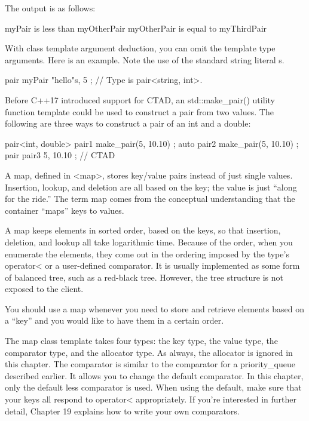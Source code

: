 The output is as follows:

\begin{shell}
myPair is less than myOtherPair
myOtherPair is equal to myThirdPair
\end{shell}

With class template argument deduction, you can omit the template type arguments. Here is an example. Note the use of the standard string literal s.

\begin{cpp}
pair myPair { "hello"s, 5 }; // Type is pair<string, int>.
\end{cpp}

Before C++17 introduced support for CTAD, an std::make\_pair() utility function template could be used to construct a pair from two values. The following are three ways to construct a pair of an int and a double:

\begin{cpp}
pair<int, double> pair1 { make_pair(5, 10.10) };
auto pair2 { make_pair(5, 10.10) };
pair pair3 { 5, 10.10 }; // CTAD
\end{cpp}


A map, defined in <map>, stores key/value pairs instead of just single values. Insertion, lookup, and deletion are all based on the key; the value is just “along for the ride.” The term map comes from the conceptual understanding that the container “maps” keys to values.

A map keeps elements in sorted order, based on the keys, so that insertion, deletion, and lookup all take logarithmic time. Because of the order, when you enumerate the elements, they come out in the ordering imposed by the type’s operator< or a user-defined comparator. It is usually implemented as some form of balanced tree, such as a red-black tree. However, the tree structure is not exposed to the client.

You should use a map whenever you need to store and retrieve elements based on a “key” and you would like to have them in a certain order.


The map class template takes four types: the key type, the value type, the comparator type, and the allocator type. As always, the allocator is ignored in this chapter. The comparator is similar to the comparator for a priority\_queue described earlier. It allows you to change the default comparator. In this chapter, only the default less comparator is used. When using the default, make sure that your keys all respond to operator< appropriately. If you’re interested in further detail, Chapter 19 explains how to write your own comparators.

